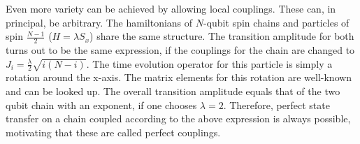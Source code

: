 \begin{center}
\end{center}

\noindent Even more variety can be achieved by allowing local couplings. These can, in principal, be arbitrary. The hamiltonians of $N$-qubit spin chains and particles of spin $\frac{N-1}{2}$ ($H = \lambda S_x$) share the same structure. The transition amplitude for both turns out to be the same expression, if the couplings for the chain are changed to $J_i = \frac{\lambda}{2}\sqrt{i(N-i)}$. The time evolution operator for this particle is simply a rotation around the x-axis. The matrix elements for this rotation are well-known and can be looked up. The overall transition amplitude equals that of the two qubit chain with an exponent, if one chooses $\lambda = 2$. Therefore, perfect state transfer on a chain coupled according to the above expression is always possible, motivating that these are called perfect couplings.

